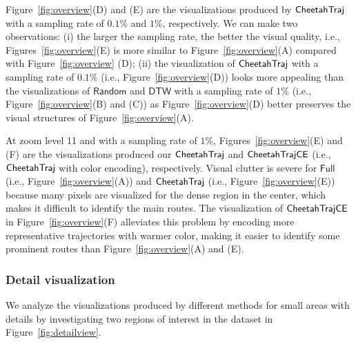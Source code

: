 Figure~\ref{fig:overview}(D) and (E) are the visualizations produced by $\mathsf{CheetahTraj}{}$ with a sampling rate of $0.1\%$ and $1\%$, respectively. We can make two observations: (i) the larger the sampling rate, the better the visual quality, i.e., Figures~\ref{fig:overview}(E) is more similar to Figure~\ref{fig:overview}(A) compared with Figure~\ref{fig:overview} (D); (ii) the visualization of $\mathsf{CheetahTraj}$ with a sampling rate of $0.1\%$ (i.e., Figure~\ref{fig:overview}(D)) looks more appealing than the visualizations of $\mathsf{Random}$ and $\mathsf{DTW}$ with a sampling rate of $1\%$ (i.e., Figure~\ref{fig:overview}(B) and (C)) as Figure~\ref{fig:overview}(D) better preserves the visual structures of Figure~\ref{fig:overview}(A).



 At zoom level 11 and with a sampling rate of $1\%$, Figures~\ref{fig:overview}(E) and (F) are the visualizations produced our $\mathsf{CheetahTraj}$ and $\mathsf{CheetahTraj}\mathsf{CE}$ (i.e., $\mathsf{CheetahTraj}$ with color encoding), respectively.
Visual clutter is severe for $\mathsf{Full}$ (i.e., Figure~\ref{fig:overview}(A)) and $\mathsf{CheetahTraj}$ (i.e., Figure~\ref{fig:overview}(E)) because many pixels are visualized for the dense region in the center, which makes it difficult to identify the main routes. The visualization of $\mathsf{CheetahTraj}\mathsf{CE}$ in Figure~\ref{fig:overview}(F) alleviates this problem by encoding more representative trajectories with warmer color, making it easier to identify some prominent routes than Figure~\ref{fig:overview}(A) and (E).

\vspace{1mm}
\subsubsection{Detail visualization}\label{sec:detail}




We analyze the visualizations produced by different methods for small areas with details by investigating two regions of interest in the \pt{} dataset in Figure~\ref{fig:detailview}.



